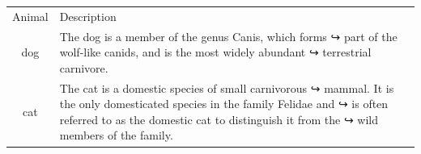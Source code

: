 \documentclass{article}
\begin{document}
\begin{tabular}{cl}
Animal & Description \\
dog & The dog is a member of the genus Canis, which forms
↪ part of the
wolf-like canids, and is the most widely abundant
↪ terrestrial
carnivore. \\
cat & The cat is a domestic species of small carnivorous
↪ mammal. It is the
only domesticated species in the family Felidae and
↪ is often referred
to as the domestic cat to distinguish it from the
↪ wild members of the
family. \\
\end{tabular}
\end{document}
